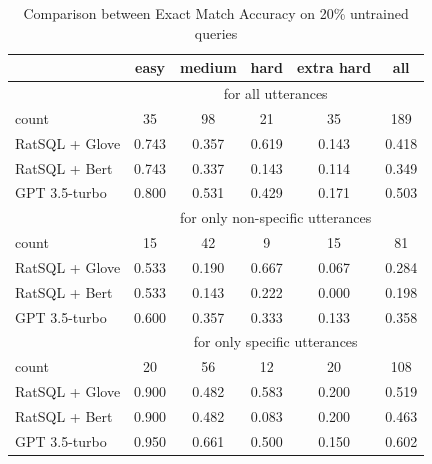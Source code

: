 \begin{table}[H]
    \begin{tabularx}{\textwidth}{Xccccc}
        \hline
                       & easy                                                 & medium & hard  & extra hard & all   \\ \hline
                       & \multicolumn{5}{c}{for all utterances}                                                     \\
        count          & 35                                                   & 98     & 21    & 35         & 189   \\ \hline
        RatSQL + Glove & 0.743                                                & 0.357  & 0.619 & 0.143      & 0.418 \\
        RatSQL + Bert  & 0.743                                                & 0.337  & 0.143 & 0.114      & 0.349 \\
        GPT 3.5-turbo  & 0.800                                                & 0.531  & 0.429 & 0.171      & 0.503 \\
        \hline
                       & \multicolumn{5}{c}{for only non-specific utterances}                                       \\
        count          & 15                                                   & 42     & 9     & 15         & 81    \\ \hline
        RatSQL + Glove & 0.533                                                & 0.190  & 0.667 & 0.067      & 0.284 \\
        RatSQL + Bert  & 0.533                                                & 0.143  & 0.222 & 0.000      & 0.198 \\
        GPT 3.5-turbo  & 0.600                                                & 0.357  & 0.333 & 0.133      & 0.358 \\
        \hline
                       & \multicolumn{5}{c}{for only specific utterances}                                           \\
        count          & 20                                                   & 56     & 12    & 20         & 108   \\ \hline
        RatSQL + Glove & 0.900                                                & 0.482  & 0.583 & 0.200      & 0.519 \\
        RatSQL + Bert  & 0.900                                                & 0.482  & 0.083 & 0.200      & 0.463 \\
        GPT 3.5-turbo  & 0.950                                                & 0.661  & 0.500 & 0.150      & 0.602 \\
    \end{tabularx}
    \caption{Comparison between Exact Match Accuracy on 20\% untrained queries}
    \label{tab:unbalance}
\end{table}
